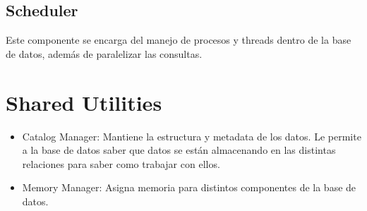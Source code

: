 \subsection{Scheduler}
Este componente se encarga del manejo de procesos y threads dentro de la base de datos, además de paralelizar las consultas.

\section{Shared Utilities}
\begin{itemize}
  \item Catalog Manager: Mantiene la estructura y metadata de los datos. Le permite a la base de datos saber que datos se están almacenando en las distintas relaciones para saber como trabajar con ellos.
  \item Memory Manager: Asigna memoria para distintos componentes de la base de datos.
\end{itemize}

